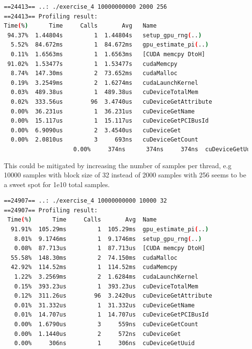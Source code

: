 \documentclass{article}
\begin{document}
\begin{mdframed}[backgroundcolor=codeColor,leftmargin=0.0cm,hidealllines=true,%
  innerleftmargin=0.1cm,innerrightmargin=0.1cm,innertopmargin=0.5cm,innerbottommargin=0.10cm,
  roundcorner=15pt]
\begin{lstlisting}[language=bash]
==24413== ..: ./exercise_4 10000000000 2000 256
==24413== Profiling result:
Time(%)      Time     Calls       Avg   Name
 94.37%  1.44804s         1  1.44804s   setup_gpu_rng(..)
  5.52%  84.672ms         1  84.672ms   gpu_estimate_pi(..)
  0.11%  1.6563ms         1  1.6563ms   [CUDA memcpy DtoH]
 91.02%  1.53477s         1  1.53477s   cudaMemcpy
  8.74%  147.30ms         2  73.652ms   cudaMalloc
  0.19%  3.2549ms         2  1.6274ms   cudaLaunchKernel
  0.03%  489.38us         1  489.38us   cuDeviceTotalMem
  0.02%  333.56us        96  3.4740us   cuDeviceGetAttribute
  0.00%  36.231us         1  36.231us   cuDeviceGetName
  0.00%  15.117us         1  15.117us   cuDeviceGetPCIBusId
  0.00%  6.9090us         2  3.4540us   cuDeviceGet
  0.00%  2.0810us         3     693ns   cuDeviceGetCount
                    0.00%     374ns      374ns     374ns  cuDeviceGetUuid
\end{lstlisting}
\end{mdframed}

This could be mitigated by increasing the number of samples per thread, e.g 10000 samples with block size of 32 instead of 2000 samples with 256 seems to be a
sweet spot for 1e10 total samples. 

\begin{mdframed}[backgroundcolor=codeColor,leftmargin=0.0cm,hidealllines=true,%
  innerleftmargin=0.1cm,innerrightmargin=0.1cm,innertopmargin=0.5cm,innerbottommargin=0.10cm,
  roundcorner=15pt]
\begin{lstlisting}[language=bash]
==24907== ..: ./exercise_4 10000000000 10000 32
==24907== Profiling result:
 Time(%)      Time     Calls       Avg  Name
  91.91%  105.29ms         1  105.29ms  gpu_estimate_pi(..)
   8.01%  9.1746ms         1  9.1746ms  setup_gpu_rng(..)
   0.08%  87.713us         1  87.713us  [CUDA memcpy DtoH]
  55.58%  148.30ms         2  74.150ms  cudaMalloc
  42.92%  114.52ms         1  114.52ms  cudaMemcpy
   1.22%  3.2569ms         2  1.6284ms  cudaLaunchKernel
   0.15%  393.23us         1  393.23us  cuDeviceTotalMem
   0.12%  311.26us        96  3.2420us  cuDeviceGetAttribute
   0.01%  31.332us         1  31.332us  cuDeviceGetName
   0.01%  14.707us         1  14.707us  cuDeviceGetPCIBusId
   0.00%  1.6790us         3     559ns  cuDeviceGetCount
   0.00%  1.1440us         2     572ns  cuDeviceGet
   0.00%     306ns         1     306ns  cuDeviceGetUuid
\end{lstlisting}
\end{mdframed}
\end{document}
